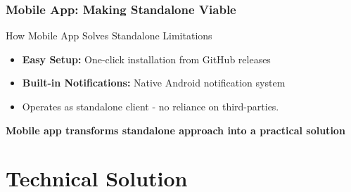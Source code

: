 \documentclass[aspectratio=169,11pt]{beamer}
\begin{document}
\begin{frame}
\frametitle{Mobile App: Making Standalone Viable}
\begin{block}{How Mobile App Solves Standalone Limitations}
\begin{itemize}
    \item \textbf{Easy Setup:} One-click installation from GitHub releases
    \item \textbf{Built-in Notifications:} Native Android notification system
    \item Operates as standalone client - no reliance on third-parties.
\end{itemize}
\end{block}

\begin{center}
\textbf{Mobile app transforms standalone approach into a practical solution}
\end{center}
\end{frame}

\section{Technical Solution}
\end{document}
